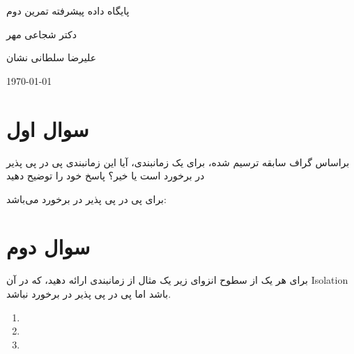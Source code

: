 \documentclass[a4paper]{article}
\begin{document}
\centerline{پایگاه داده پیشرفته تمرین دوم}
\centerline{دکتر شجاعی مهر}
\centerline{علیرضا سلطانی نشان}
\centerline{\today}

\section{سوال اول}

براساس گراف سابقه ترسیم شده، برای یک زمانبندی، آیا این زمانبندی پی در پی پذیر در
برخورد است یا خیر؟ پاسخ خود را توضیح دهید

برای پی در پی پذیر در برخورد می‌باشد:

\begin{LTR}
    \begin{table}[h]
        \centering
        \begin{RTL}
            \caption{نمونه‌ای از فرایند ACA}
        \end{RTL}
    \end{table}
\end{LTR}


\section{سوال دوم}

برای هر یک از سطوح انزوای زیر یک مثال از زمانبندی ارائه دهید، که در آن Isolation
باشد اما پی در پی پذیر در برخورد نباشد.

\begin{enumerate}
    \item {}
    \item {}
    \item {}
\end{enumerate}
\end{document}
